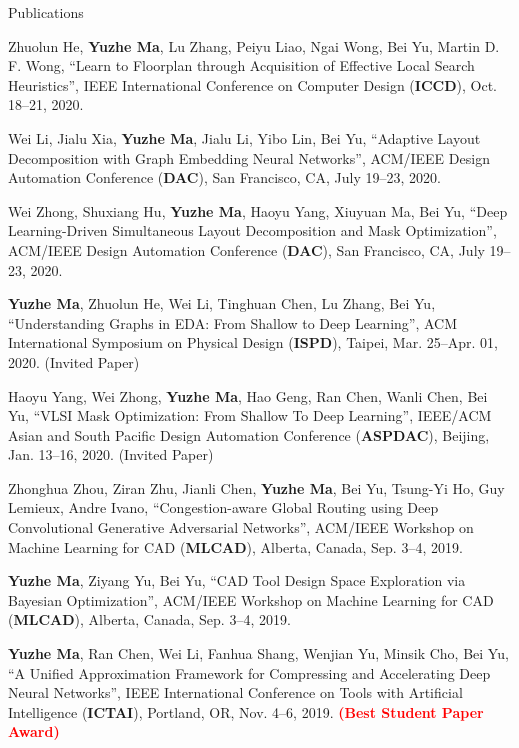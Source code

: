 \begin{rSection}{Publications}
\begin{etaremune}
\item{
        Zhuolun He, \textbf{Yuzhe Ma}, Lu Zhang, Peiyu Liao, Ngai Wong, Bei Yu, Martin D. F. Wong,
        ``Learn to Floorplan through Acquisition of Effective Local Search Heuristics'',
        IEEE International Conference on Computer Design (\textbf{ICCD}), Oct. 18–21, 2020.
    }

\item{
        Wei Li, Jialu Xia, \textbf{Yuzhe Ma}, Jialu Li, Yibo Lin, Bei Yu,
        ``Adaptive Layout Decomposition with Graph Embedding Neural Networks'',
        ACM/IEEE Design Automation Conference (\textbf{DAC}), San Francisco, CA, July 19–23, 2020.
    }

\item{
        Wei Zhong, Shuxiang Hu, \textbf{Yuzhe Ma}, Haoyu Yang, Xiuyuan Ma, Bei Yu,
        ``Deep Learning-Driven Simultaneous Layout Decomposition and Mask Optimization'',
        ACM/IEEE Design Automation Conference (\textbf{DAC}), San Francisco, CA, July 19–23, 2020.
    }

\item{
        \textbf{Yuzhe Ma}, Zhuolun He, Wei Li, Tinghuan Chen, Lu Zhang, Bei Yu,
        ``Understanding Graphs in EDA: From Shallow to Deep Learning'',
        ACM International Symposium on Physical Design (\textbf{ISPD}), Taipei, Mar. 25–Apr. 01, 2020. (Invited Paper)
    }

\item{
        Haoyu Yang, Wei Zhong, \textbf{Yuzhe Ma}, Hao Geng, Ran Chen, Wanli Chen, Bei Yu,
        ``VLSI Mask Optimization: From Shallow To Deep Learning'',
        IEEE/ACM Asian and South Pacific Design Automation Conference (\textbf{ASPDAC}), Beijing, Jan. 13--16, 2020. (Invited Paper)
}

\item{
        Zhonghua Zhou, Ziran Zhu, Jianli Chen, \textbf{Yuzhe Ma}, Bei Yu, Tsung-Yi Ho, Guy Lemieux, Andre Ivano,
        ``Congestion-aware Global Routing using Deep Convolutional Generative Adversarial Networks'',
        ACM/IEEE Workshop on Machine Learning for CAD (\textbf{MLCAD}), Alberta, Canada, Sep. 3--4, 2019.
}

\item{
        \textbf{Yuzhe Ma}, Ziyang Yu, Bei Yu,
        ``CAD Tool Design Space Exploration via Bayesian Optimization'',
        ACM/IEEE Workshop on Machine Learning for CAD (\textbf{MLCAD}), Alberta, Canada, Sep. 3--4, 2019.
}

\item{
   \textbf{Yuzhe Ma}, Ran Chen, Wei Li, Fanhua Shang, Wenjian Yu, Minsik Cho, Bei Yu,
        ``A Unified Approximation Framework for Compressing and Accelerating Deep Neural Networks'',
        IEEE International Conference on Tools with Artificial Intelligence (\textbf{ICTAI}), Portland, OR, Nov. 4--6, 2019.
        \textcolor{red}{\textbf{(Best Student Paper Award)}}
}


\end{etaremune}
\end{rSection}
